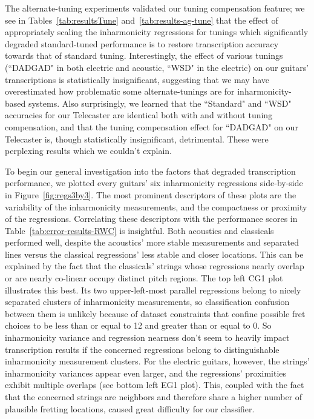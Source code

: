 \documentclass[12pt]{cmuthesis}
\begin{document}
The alternate-tuning experiments validated our tuning compensation feature; we see in Tables~\ref{tab:resultsTune} and~\ref{tab:results-ag-tune} that the effect of appropriately scaling the inharmonicity regressions for tunings which significantly degraded standard-tuned performance is to restore transcription accuracy towards that of standard tuning. Interestingly, the effect of various tunings (``DADGAD" in both electric and acoustic, ``WSD" in the electric) on our guitars' transcriptions is statistically insignificant, suggesting that we may have overestimated how problematic some alternate-tunings are for inharmonicity-based systems. Also surprisingly, we learned that the ``Standard" and ``WSD" accuracies for our Telecaster are identical both with and without tuning compensation, and that the tuning compensation effect for ``DADGAD" on our Telecaster is, though statistically insignificant, detrimental. These were perplexing results which we couldn't explain.


To begin our general investigation into the factors that degraded transcription performance, we plotted every guitars' six inharmonicity regressions side-by-side in Figure~\ref{fig:regs3by3}. The most prominent descriptors of these plots are the variability of the inharmonicity measurements, and the compactness or proximity of the regressions. Correlating these descriptors with the performance scores in Table~\ref{tab:error-results-RWC} is insightful. Both acoustics and classicals performed well, despite the acoustics' more stable measurements and separated lines versus the classical regressions' less stable and closer locations. This can be explained by the fact that the classicals' strings whose regressions nearly overlap or are nearly co-linear occupy distinct pitch regions. The top left CG1 plot illustrates this best. Its two upper-left-most parallel regressions belong to nicely separated clusters of inharmonicity measurements, so classification confusion between them is unlikely because of dataset constraints that confine possible fret choices to be less than or equal to 12 and greater than or equal to 0. So inharmonicity variance and regression nearness don't seem to heavily impact transcription results if the concerned regressions belong to distinguishable inharmonicity measurement clusters. For the electric guitars, however, the strings' inharmonicity variances appear even larger, and the regressions' proximities exhibit multiple overlaps (see bottom left EG1 plot). This, coupled with the fact that the concerned strings are neighbors and therefore share a higher number of plausible fretting locations, caused great difficulty for our classifier.
\end{document}
